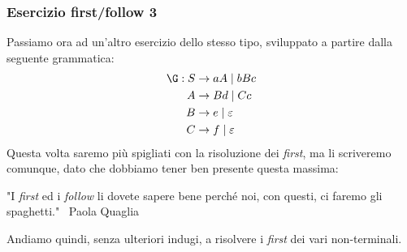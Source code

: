 \documentclass[class=book, crop=false, oneside, 12pt]{standalone}
\begin{document}
\subsubsection{Esercizio first/follow 3}
\label{first-follow-ex-3}
Passiamo ora ad un'altro esercizio dello stesso tipo, sviluppato a partire dalla seguente grammatica:
\begin{align*}
    \G: S &\to aA \mid bBc \\
    A &\to Bd \mid Cc \\
    B &\to e \mid \varepsilon \\
    C &\to f \mid \varepsilon
\end{align*}
Questa volta saremo più spigliati con la risoluzione dei \emph{first}, ma li scriveremo comunque, dato che dobbiamo tener ben presente questa massima:
\begin{displayquote}
    "I \emph{first} ed i \emph{follow} li dovete sapere bene perché noi, con questi, ci faremo gli spaghetti."
    ~Paola Quaglia
\end{displayquote}

\noindent Andiamo quindi, senza ulteriori indugi, a risolvere i \emph{first} dei vari non-terminali.
\end{document}
